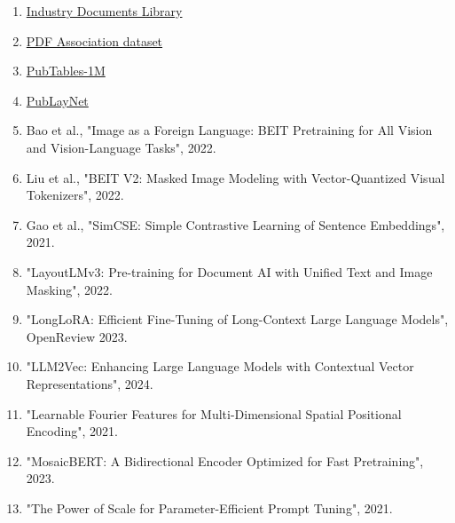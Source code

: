 \documentclass{article}
\begin{document}
\begin{enumerate}
    \item \href{https://huggingface.co/datasets/pixparse/idl-wds}{Industry Documents Library}
    \item \href{https://huggingface.co/datasets/pixparse/pdfa-eng-wds}{PDF Association dataset}
    \item \href{https://huggingface.co/datasets/bsmock/pubtables-1m}{PubTables-1M}
    \item \href{https://huggingface.co/datasets/creative-graphic-design/PubLayNet}{PubLayNet}
    \item Bao et al., "Image as a Foreign Language: BEIT Pretraining for All Vision and Vision-Language Tasks", 2022.
    \item Liu et al., "BEIT V2: Masked Image Modeling with Vector-Quantized Visual Tokenizers", 2022.
    \item Gao et al., "SimCSE: Simple Contrastive Learning of Sentence Embeddings", 2021.
    \item "LayoutLMv3: Pre-training for Document AI with Unified Text and Image Masking", 2022.
    \item "LongLoRA: Efficient Fine-Tuning of Long-Context Large Language Models", OpenReview 2023.
    \item "LLM2Vec: Enhancing Large Language Models with Contextual Vector Representations", 2024.
    \item "Learnable Fourier Features for Multi-Dimensional Spatial Positional Encoding", 2021.
    \item "MosaicBERT: A Bidirectional Encoder Optimized for Fast Pretraining", 2023.
    \item "The Power of Scale for Parameter-Efficient Prompt Tuning", 2021.
\end{enumerate}
\end{document}
